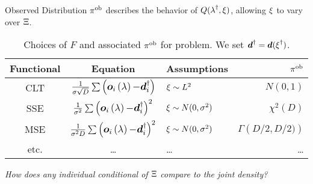 \begin{block}{Observed Distribution}
\centering
\large
    $\operatorname*{\pi^{ob}}$ describes the behavior of $Q(\operatorname*{\lambda}^\dagger, \operatorname*{\xi})$, allowing $\operatorname*{\xi}$ to vary over $\operatorname*{\Xi}$.

    \begin{table}
      \centering
      \begin{tabular}{c c l r}
        \toprule
        \textbf{Functional} & \textbf{Equation} & \textbf{Assumptions} & \bf{$\operatorname*{\pi^{ob}}$} \\
        \midrule
        CLT & $\frac{1}{\sigma\sqrt{D}} \large\sum \left( \boldsymbol{o}_i\operatorname*{\left ( \operatorname*{\lambda} \right )} - \boldsymbol{d}_i^\dagger \right)$ & $\operatorname*{\xi} \sim L^2$ & $N(0,1)$ \\
        SSE &  $\frac{1}{\sigma^2} \large\sum \left ( \boldsymbol{o}_i\operatorname*{\left ( \operatorname*{\lambda} \right )} - \boldsymbol{d}_i^\dagger \right)^2$ & $\operatorname*{\xi} \sim N(0,\sigma^2)$ & $\chi^2 (D)$ \\
        MSE & $\frac{1}{\sigma^2 D} \large\sum \left ( \boldsymbol{o}_i\operatorname*{\left ( \operatorname*{\lambda} \right )} - \boldsymbol{d}_i^\dagger \right)^2$ & $\operatorname*{\xi} \sim N(0,\sigma^2)$ & $\Gamma \left ( D/2, D/2) \right )$ \\
        etc. & \dots & \dots & \dots \\
        \bottomrule
      \end{tabular}
      \caption{\normalsize Choices of $F$ and associated $\operatorname*{\pi^{ob}}$ for problem. We set $\boldsymbol{d}^\dagger = \boldsymbol{d}(\operatorname*{\xi}^\dagger)$.}
    \end{table}

    \emph{How does any individual conditional of $\operatorname*{\Xi}$ compare to the joint density?}

\end{block}
